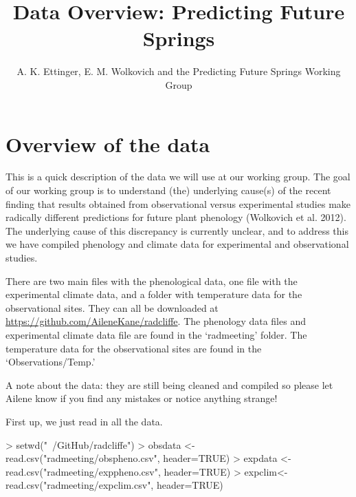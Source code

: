 \documentclass{article}
\begin{document}
% 
\title{Data Overview: Predicting Future Springs} %
\author{A. K. Ettinger, E. M. Wolkovich and the Predicting Future Springs Working Group}
\maketitle  %
\section {Overview of the data}

This is a quick description of the data we will use at our working group. The goal of our working group is to understand (the) underlying cause(s) of the recent finding that results obtained from observational versus experimental studies make radically different predictions for future plant phenology (Wolkovich et al. 2012). The underlying cause of this discrepancy is currently unclear, and to address this we have compiled phenology and climate data for experimental and observational studies. 

There are two main files with the phenological data, one file with the experimental climate data, and a folder with temperature data for the observational sites. They can all be downloaded at \url{https://github.com/AileneKane/radcliffe}. The phenology data files and experimental climate data file are found in the `radmeeting' folder. The temperature data for the observational sites are found in the `Observations/Temp.'

A note about the data: they are still being cleaned and compiled so please let Ailene know if you find any mistakes or notice anything strange! 

First up, we just read in all the data. 

\begin{Schunk}
\begin{Sinput}
> setwd("~/GitHub/radcliffe")
> obsdata <- read.csv("radmeeting/obspheno.csv", header=TRUE)
> expdata <- read.csv("radmeeting/exppheno.csv", header=TRUE)
> expclim<-read.csv("radmeeting/expclim.csv", header=TRUE)
\end{Sinput}
\end{Schunk}
\end{document}
